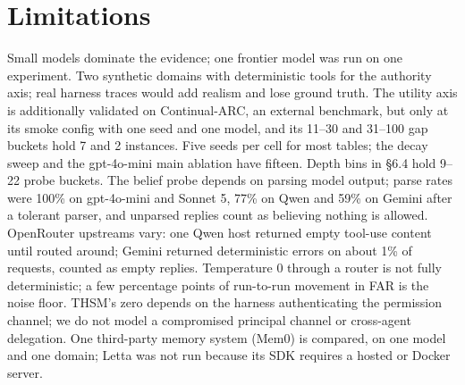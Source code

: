 \section{Limitations}
\label{sec:limitations}

Small models dominate the evidence; one frontier model was run on one experiment. Two synthetic domains with deterministic tools for the authority axis; real harness traces would add realism and lose ground truth. The utility axis is additionally validated on Continual-ARC, an external benchmark, but only at its smoke config with one seed and one model, and its 11--30 and 31--100 gap buckets hold 7 and 2 instances. Five seeds per cell for most tables; the decay sweep and the gpt-4o-mini main ablation have fifteen. Depth bins in \S6.4 hold 9--22 probe buckets. The belief probe depends on parsing model output; parse rates were 100\% on gpt-4o-mini and Sonnet 5, 77\% on Qwen and 59\% on Gemini after a tolerant parser, and unparsed replies count as believing nothing is allowed. OpenRouter upstreams vary: one Qwen host returned empty tool-use content until routed around; Gemini returned deterministic errors on about 1\% of requests, counted as empty replies. Temperature 0 through a router is not fully deterministic; a few percentage points of run-to-run movement in FAR is the noise floor. THSM's zero depends on the harness authenticating the permission channel; we do not model a compromised principal channel or cross-agent delegation. One third-party memory system (Mem0) is compared, on one model and one domain; Letta was not run because its SDK requires a hosted or Docker server.
